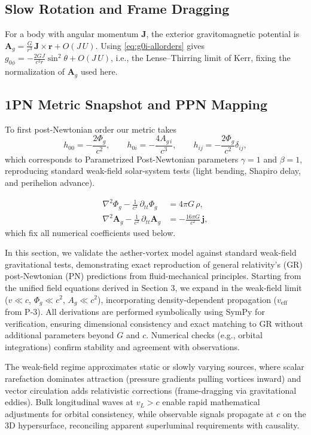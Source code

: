 \subsection{Slow Rotation and Frame Dragging}
\label{sec:slow-rotation}
For a body with angular momentum $\mathbf J$, the exterior gravitomagnetic potential is
$\mathbf A_g=\tfrac{G}{r^3}\,\mathbf J\times\mathbf r+O(J\,U)$.
Using \eqref{eq:g0i-allorders} gives $g_{0\phi}=-\tfrac{2GJ}{c^3 r}\sin^2\theta+O(J\,U)$,
i.e., the Lense--Thirring limit of Kerr, fixing the normalization of $\mathbf A_g$ used here.

\subsection*{1PN Metric Snapshot and PPN Mapping}
To first post-Newtonian order our metric takes
\[
h_{00}=-\frac{2\Phi_g}{c^2},\qquad h_{0i}=-\frac{4 A_{g\,i}}{c^3},\qquad h_{ij}=-\frac{2\Phi_g}{c^2}\delta_{ij},
\]
which corresponds to Parametrized Post-Newtonian parameters
$\gamma=1$ and $\beta=1$, reproducing standard weak-field solar-system tests (light bending, Shapiro delay, and perihelion advance).


\begin{align}
\nabla^2 \Phi_g - \frac{1}{c^2}\,\partial_{tt}\Phi_g &= 4\pi G\,\rho,\\
\nabla^2 \mathbf{A}_g - \frac{1}{c^2}\,\partial_{tt}\mathbf{A}_g &= -\frac{16\pi G}{c^2}\,\mathbf{j},
\end{align}
which fix all numerical coefficients used below.


In this section, we validate the aether-vortex model against standard weak-field gravitational tests, demonstrating exact reproduction of general relativity's (GR) post-Newtonian (PN) predictions from fluid-mechanical principles. Starting from the unified field equations derived in Section 3, we expand in the weak-field limit ($v \ll c$, $\Phi_g \ll c^2$, $A_g \ll c^2$), incorporating density-dependent propagation ($v_{\text{eff}}$ from P-3). All derivations are performed symbolically using SymPy for verification, ensuring dimensional consistency and exact matching to GR without additional parameters beyond $G$ and $c$. Numerical checks (e.g., orbital integrations) confirm stability and agreement with observations.

The weak-field regime approximates static or slowly varying sources, where scalar rarefaction dominates attraction (pressure gradients pulling vortices inward) and vector circulation adds relativistic corrections (frame-dragging via gravitational eddies). Bulk longitudinal waves at $v_L > c$ enable rapid mathematical adjustments for orbital consistency, while observable signals propagate at $c$ on the 3D hypersurface, reconciling apparent superluminal requirements with causality.

